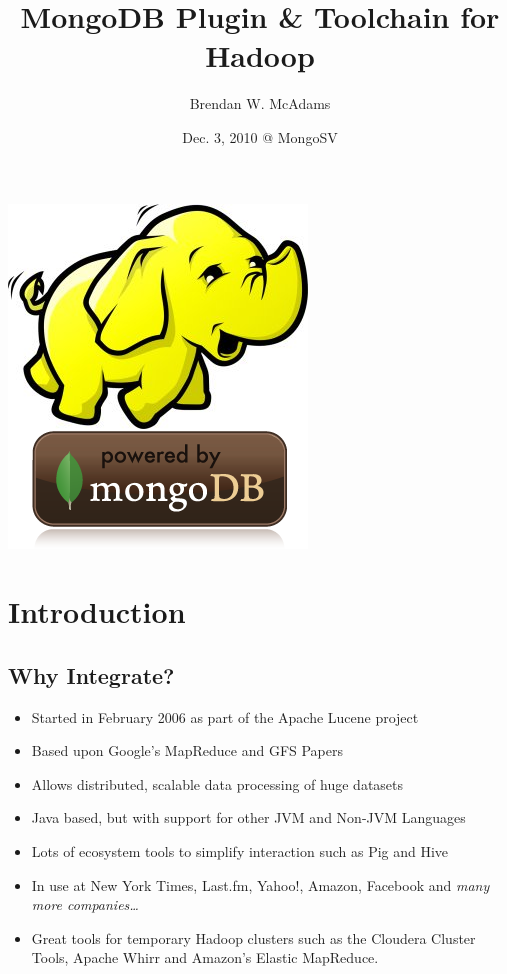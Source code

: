 \documentclass[xcolor=dvipsnames]{beamer}
\title{MongoDB Plugin \& Toolchain for Hadoop} %
\institute[10gen, Inc.]{10gen, Inc.}
\author[B.W. McAdams]{Brendan W. McAdams}
\date{Dec. 3, 2010 @ MongoSV}
\newenvironment{itemizeframe}
               {\begin{frame}\startitemizeframe} 
               {\stopitemizeframe\end{frame}}
\newcommand\startitemizeframe{\begin{itemize}} \newcommand\stopitemizeframe{\end{itemize}}
\begin{document}
\begin{frame}
  \titlepage
  \begin{center}
  \includegraphics{images/mongo_hadoop.png}
  \end{center}
\end{frame}

\section{Introduction}

\subsection[Mongo + Hadoop]{Why Integrate?}
\begin{itemizeframe}
    \frametitle{Hadoop Explained\ldots}
	\item Started in February 2006 as part of the Apache Lucene project
	\item Based upon Google's MapReduce and GFS Papers
	\item Allows distributed, scalable data processing of huge datasets
	\item Java based, but with support for other JVM and Non-JVM Languages
	\item Lots of ecosystem tools to simplify interaction such as Pig and Hive
	\item In use at New York Times, Last.fm, Yahoo!, Amazon, Facebook and {\em many more companies\ldots}
	\item Great tools for temporary Hadoop clusters such as the Cloudera Cluster Tools, Apache Whirr and Amazon's Elastic MapReduce.
\end{itemizeframe}
\end{document}
